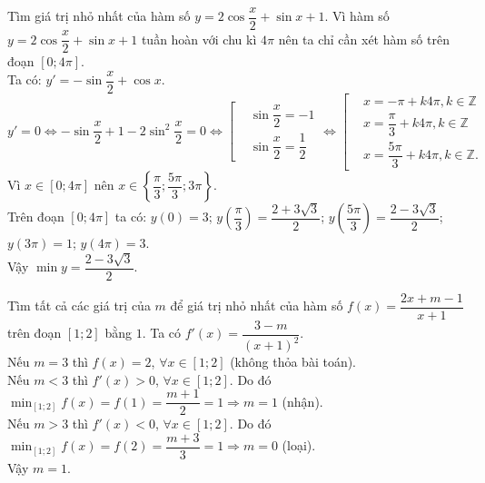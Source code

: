 \begin{bt}%
	Tìm giá trị nhỏ nhất của hàm số  $y=2\cos \dfrac{x}{2}+\sin x+1 $.
	\loigiai
	{
		Vì hàm số $y=2\cos \dfrac{x}{2}+\sin x+1$ tuần hoàn với chu kì $4\pi $ nên ta chỉ cần xét hàm số trên đoạn $\left[0;4\pi \right]$.\\
		Ta có: $y'=-\sin \dfrac{x}{2}+\cos x$.
		$$y'=0\Leftrightarrow-\sin \dfrac{x}{2}+1-2\sin^2\dfrac{x}{2}=0 \Leftrightarrow \left[ \begin{aligned} &\sin\dfrac{x}{2}  = -1 \\ &\sin\dfrac{x}{2}   = \dfrac{1}{2} \end{aligned} \right. \Leftrightarrow \left[ \begin{aligned} &x  = -\pi + k4\pi, k \in \mathbb{Z} \\& x  = \dfrac{\pi}{3} + k4\pi, k\in\mathbb{Z} \\ &x  = \dfrac{5\pi}{3} + k4\pi, k\in\mathbb{Z}. \end{aligned} \right. $$
		Vì $x \in \left[ 0; 4 \pi \right]$ nên $x\in \left\{\dfrac{\pi}{3};\dfrac{5\pi}{3};3\pi \right\}$.\\
		Trên đoạn $\left[ 0; 4 \pi \right]$ ta có: $y\left( 0\right) =3$; $y\left(\dfrac{\pi}{3}\right)=\dfrac{2+3\sqrt{3}}{2}$; $y\left(\dfrac{5\pi}{3}\right)=\dfrac{2-3\sqrt{3}}{2}$; $y\left(3\pi \right)=1$;  $y\left(4\pi \right)=3$.\\
		Vậy $\min y=\dfrac{2-3\sqrt{3}}{2}$.
	}
	
\end{bt}


\begin{bt}%
	Tìm tất cả các giá trị của $m$ để giá trị nhỏ nhất của hàm số $f(x)=\dfrac{2x+m-1}{x+1}$ trên đoạn $[1;2]$ bằng $1$.
	\loigiai
	{
		Ta có $f'(x)=\dfrac{3-m}{(x+1)^2}$.\\
		Nếu $m=3$ thì $f(x)=2$, $\forall x\in [1;2]$ (không thỏa bài toán).\\
		Nếu $m<3$ thì $f'(x)>0$, $\forall x\in [1;2]$. Do đó $\displaystyle \min_{[1;2]}{f(x)}=f(1)=\dfrac{m+1}{2}=1 \Rightarrow m=1$ (nhận).\\
		Nếu $m>3$ thì $f'(x)<0$, $\forall x\in [1;2]$. Do đó $\displaystyle \min_{[1;2]}{f(x)}=f(2)=\dfrac{m+3}{3}=1 \Rightarrow m=0$ (loại).\\
		Vậy $m=1$.
	}
\end{bt}


